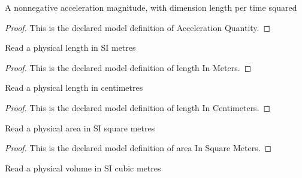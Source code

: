 \begin{definition}
  \label{def:physics:phyx-mini-0366:phyxminiproblems-problemphyxmini0366-accelerationquantity}
  A nonnegative acceleration magnitude, with dimension length per time squared
\end{definition}
\begin{proof}
  This is the declared model definition of Acceleration Quantity.
\end{proof}
\begin{definition}
  \label{def:physics:phyx-mini-0366:phyxminiproblems-problemphyxmini0366-lengthinmeters}
  Read a physical length in SI metres
\end{definition}
\begin{proof}
  This is the declared model definition of length In Meters.
\end{proof}
\begin{definition}
  \label{def:physics:phyx-mini-0366:phyxminiproblems-problemphyxmini0366-lengthincentimeters}
  Read a physical length in centimetres
\end{definition}
\begin{proof}
  This is the declared model definition of length In Centimeters.
\end{proof}
\begin{definition}
  \label{def:physics:phyx-mini-0366:phyxminiproblems-problemphyxmini0366-areainsquaremeters}
  Read a physical area in SI square metres
\end{definition}
\begin{proof}
  This is the declared model definition of area In Square Meters.
\end{proof}
\begin{definition}
  \label{def:physics:phyx-mini-0366:phyxminiproblems-problemphyxmini0366-volumeincubicmeters}
  Read a physical volume in SI cubic metres
\end{definition}
